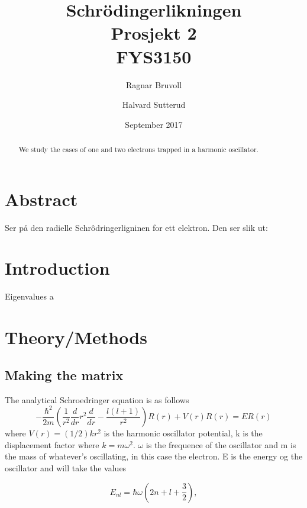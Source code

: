 \documentclass[12pt]{article}
\begin{document}
\title{Schrödingerlikningen
\\ Prosjekt 2
\\ FYS3150}
\author{Ragnar Bruvoll \and Halvard Sutterud}
\date{September 2017}
\maketitle{\begin{center}\end{center}}
\thispagestyle{empty}

\begin{abstract}
    We study the cases of one and two electrons trapped in a harmonic oscillator. 

\end{abstract}
\newpage
{}


\section*{Abstract}
Ser på den radielle Schrôdringerligninen for ett elektron. Den ser slik ut:


\section*{Introduction}
Eigenvalues a


\section*{Theory/Methods}
\subsection*{Making the matrix}
The analytical Schroedringer equation is as follows
\begin{equation*}
  -\frac{\hbar^2}{2 m} \left ( \frac{1}{r^2} \frac{d}{dr} r^2
  \frac{d}{dr} - \frac{l (l + 1)}{r^2} \right )R(r) 
     + V(r) R(r) = E R(r)
\end{equation*}
where  $V(r) = (1/2)kr^2$ is the harmonic oscillator potential, k is the displacement factor where $k=m\omega^2$.
$\omega$ is the frequence of the oscillator and m is the mass of whatever's oscillating, in this case the electron. E is the energy og the oscillator and will take the values

\begin{equation*}
E_{nl}=  \hbar \omega \left(2n+l+\frac{3}{2}\right),
\end{equation*}
\end{document}
